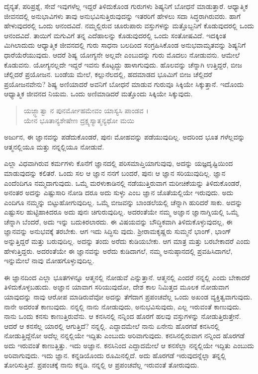 ದೈನ್ಯತೆ, ಪರಿಪ್ರಶ್ನೆ, ಸೇವೆ ಇವುಗಳೆಲ್ಲ ಇದ್ದರೆ ತಿಳಿದುಕೊಂಡ ಗುರುಗಳು ಶಿಷ್ಯನಿಗೆ ಬೋಧನೆ ಮಾಡುತ್ತಾರೆ. ಆಧ್ಯಾತ್ಮಿಕ ಜೀವನದಲ್ಲಿ ಅನುಭಾವಿಗಳು ತಾವು ಅನುಭವಿಸುತ್ತಿರುವುದನ್ನು ಇತರರಿಗೆ ಹೇಳಲು ಸದಾ ಸಿದ್ಧರಾಗಿರುವರು. ಹಾಗೆ ಹೇಳುವುದರಲ್ಲಿ ಒಂದು ಆನಂದವಿದೆ. ನಮ್ಮಲ್ಲಿರುವ ಚೂರುಪಾರು ವಸ್ತುಗಳನ್ನು ಮತ್ತೊಬ್ಬನಿಗೆ ಕೊಡುವುದರಲ್ಲಿ ಒಂದು ಆನಂದವಿದೆ. ತಾಯಿಗೆ ಮಗುವಿಗೆ ತನ್ನ ಎದೆಹಾಲನ್ನು ಕೊಡುವುದರಲ್ಲಿ ಒಂದು ಸಂತೋಷವಿದೆ. ಇದಕ್ಕಿಂತ ಮಿಗಿಲಾದುದು ಆಧ್ಯಾತ್ಮಿಕ ಜೀವನದಲ್ಲಿ ಗುರು ಸಾಧನಾ ಬಲದಿಂದ ಸಂಗ್ರಹಿಸಿಕೊಂಡ ಅನುಭವಾಮೃತವನ್ನು ಶಿಷ್ಯನಿಗೆ ಧಾರೆಯೆರೆಯುವುದು. ಆದರೆ ಶಿಷ್ಯ ಯೋಗ್ಯನೇ ಅಲ್ಲವೇ ಎಂಬುದನ್ನು ಗುರು ಮೊದಲು ನೋಡುವನು. ಆಮೇಲೆ ಕೊಡುವನು. ಯೋಗ್ಯನಲ್ಲದೇ ಇದ್ದರೆ ಇವನು ಕೊಟ್ಟದ್ದು ಹಾಳಾಗುವುದು. ಹೊಲವನ್ನು ಚೆನ್ನಾಗಿ ಉತ್ತಿದ್ದರೆ, ಬೀಜ ಚೆಲ್ಲಿದರೆ ಪ್ರಯೋಜನ. ಬಂಡೆಯ ಮೇಲೆ, ಕಲ್ಲುನೆಲದಲ್ಲಿ, ಹದಮಾಡದ ಭೂಮಿಗೆ ಬೀಜ ಚೆಲ್ಲಿದರೆ ಪ್ರಯೋಜನವೇನು? ಶಿಷ್ಯ ಅಣಿಯಾದರೆ ಅವನಿಗೆ ಬೋಧನೆ ಮಾಡುವ ಗುರುವೂ ಸಿಕ್ಕಿಯೇ ಸಿಕ್ಕುತ್ತಾನೆ. ಇದೊಂದು ಆಧ್ಯಾತ್ಮಿಕ ಜೀವನದ ನಿಯಮ. ಒಂದು ಅಣಿಮಾಡಿದರೆ ಮತ್ತೊಂದು ಸಿಕ್ಕಿಯೇ ಸಿಕ್ಕುವುದು.

\begin{verse}
ಯಜ್ಜ್ಞಾತ್ವಾ ನ ಪುನರ್ಮೋಹಮೇವಂ ಯಾಸ್ಯಸಿ ಪಾಂಡವ ।\\ಯೇನ ಭೂತಾನ್ಯಶೇಷೇಣ ದ್ರಕ್ಷ್ಯಸ್ಯಾತ್ಮನ್ಯಥೋ ಮಯಿ 
\end{verse}

{\small ಅರ್ಜುನ, ಈ ಜ್ಞಾನವನ್ನು ಪಡೆದುಕೊಂಡರೆ, ಪುನಃ ಮೋಹವನ್ನು ಪಡೆಯುವುದಿಲ್ಲ. ಅದರಿಂದ ಭೂತ ಗಳೆಲ್ಲವನ್ನು ಆತ್ಮನಲ್ಲಿಯೂ ಮತ್ತು ನನ್ನಲ್ಲಿಯೂ ನೋಡುವೆ.}

ಎಲ್ಲಾ ವಿಧವಾಗಿರುವ ಕರ್ಮಗಳು ಕೊನೆಗೆ ಜ್ಞಾನದಲ್ಲಿ ಪರಿಸಮಾಪ್ತಿಯಾಗುವುವು, ಅದನ್ನು ಯಜ್ಞದೃಷ್ಟಿಯಿಂದ ಮಾಡುವುದನ್ನು ಕಲಿತರೆ. ಒಂದು ಸಲ ಆ ಜ್ಞಾನ ನನಗೆ ಬಂದರೆ, ಪುನಃ ಆ ಜ್ಞಾನ ಸರಿಯುವುದಿಲ್ಲ. ಜ್ಞಾನ ಎಂದೆಂದಿಗೂ ನಮ್ಮದಾಗುವುದು. ಒಮ್ಮೆ ಮರಳುಕಾಡಿನಲ್ಲಿ ನಡೆಯುತ್ತಿರುವಾಗ ಮರೀಚಿಕೆಯನ್ನು ತಿಳಿದುಕೊಂಡರೆ, ಅನಂತರ ಅದನ್ನು ಎಷ್ಟುಸಾರಿ ನೋಡಿ ದರೂ ಅದು ಸುಳ್ಳು ಎಂಬ ಜ್ಞಾನ ಜೊತೆಯಲ್ಲಿಯೇ ಇರುವುದು. ಅದು ಎಂದಿಗೂ ನಮ್ಮನ್ನು ಬಿಟ್ಟುಹೋಗುವುದಿಲ್ಲ. ಒಮ್ಮೆ ಬೀಜವನ್ನು ಬಾಂಡಲೆಯಲ್ಲಿ ಚೆನ್ನಾಗಿ ಹುರಿದರೆ ಸಾಕು. ಅದನ್ನು ಎಷ್ಟುಸಲ ಹುಟ್ಟಿಹಾಕಿದರೂ ಅದು ಪುನಃ ಚಿಗುರುವುದಿಲ್ಲ. ಅದರಂತೆಯೇ ನಮ್ಮ ಅಜ್ಞಾನ ಜ್ಞಾನಾಗ್ನಿಯಲ್ಲಿ ಒಮ್ಮೆ ಚೆನ್ನಾಗಿ ಬೆಂದರೆ, ಅದು ಇನ್ನು ಬದುಕಿರಲಾರದು. ಈ ವಿಷಯವನ್ನು ಬೌದ್ಧಿಕವಾಗಿ ತಿಳಿದುಕೊಳ್ಳುವುದಲ್ಲ, ಈ ಜ್ಞಾನವನ್ನು ಅನುಭವಕ್ಕೆ ತರಬೇಕು. ಆಗ ಇದು ಸಿದ್ಧಿಸು ವುದು. ಶ್ರೀರಾಮಕೃಷ್ಣರು ಸುಮ್ಮನೆ ಭಾಂಗ್, ಭಾಂಗ್ ಅನ್ನುತ್ತಿದ್ದರೆ ಮತ್ತು ಬರುವುದಿಲ್ಲ. ಅದನ್ನು ತಂದು ಅರೆದು ಕುಡಿಯಬೇಕು. ಆಗ ಮಾತ್ರ ಮತ್ತು ಬರಬೇಕಾದರೆ ಎಂದು ಹೇಳುತ್ತಿದ್ದರು. ಅದರಂತೆಯೇ ಈ ಜ್ಞಾನವನ್ನು ಅರೆದು ಕುಡಿದಾಗಲೆ, ನಮ್ಮ ಅನುಷ್ಠಾನದಲ್ಲಿ ಪ್ರವಹಿಸಿದಾಗಲೆ, ಇನ್ನುಮೇಲೆ ನಾವು ಮೋಹಗೊಳ್ಳುವುದಿಲ್ಲ.

ಈ ಜ್ಞಾನದಿಂದ ಎಲ್ಲಾ ಭೂತಗಳನ್ನೂ ಆತ್ಮನಲ್ಲಿ ನೋಡುವೆ ಎನ್ನುತ್ತಾನೆ. ಆತ್ಮನಲ್ಲಿ ಎಂದರೆ ನನ್ನಲ್ಲಿ ಎಂದು ಬೇಕಾದರೆ ತಿಳಿದುಕೊಳ್ಳಬಹುದು. ಅಜ್ಞಾನ ಯಾವಾಗ ಸರಿಯುವುದೋ, ದೇಶ ಕಾಲ ನಿಮಿತ್ತದ ಮೂಲಕ ನೋಡುವಾಗ ಯಾವುದನ್ನು ನಾವು ಆರೋಪ ಮಾಡಿರುವೆವೋ ಅದನ್ನು ತೆಗೆದಾಗ ಪ್ರಪಂಚವೆಲ್ಲ ಒಂದು ಅಖಂಡ ವ್ಯಕ್ತಿತ್ವವಾಗುವುದು. ನಾನೇ ಅದರಂತೆ ಕಾಣುವುದು. ನನ್ನಲ್ಲಿ ನಾನು ನೋಡುವುದು, ಅನುಭವಿಸುವುದು, ಎಲ್ಲ ಇರುವಂತೆ ಕಾಣುವುದು. ನಾನು ಒಂದು ಕನಸು ಕಾಣುತ್ತಿರುವೆನು. ಆ ಕನಸಿನಲ್ಲಿ ನನ್ನಿಂದ ಹೊರಗೆ ಹಲವು ವಸ್ತುಗಳನ್ನು ನೋಡುತ್ತಿರುತ್ತೇನೆ. ಆದರೆ ಆ ಕನಸೆಲ್ಲ ಯಾರಲ್ಲಿ ಆಗುತ್ತಿದೆ? ನನ್ನಲ್ಲಿ. ಎದ್ದಾದಮೇಲೆ ನಾನು ಏನೇನು ಹೊರಗಡೆ ಕನಸಿನಲ್ಲಿ ನೋಡುತ್ತಿದ್ದೆನೋ ಅದೆಲ್ಲ ನನ್ನಲ್ಲಿಯೇ ಇದ್ದಿತು ಎಂಬುದು ಅರಿವಾಗುವುದು. ಕನಸಿನಲ್ಲಿರುವಾಗ ನನ್ನಿಂದ ಹೊರಗಡೆ ಅದು ಇರುವಂತೆ ಕಾಣುತ್ತಿತ್ತು. ಇದು ಅಜ್ಞಾನ. ಕನಸಿನಿಂದ ಎದ್ದಾದಮೇಲೆ ಆ ಕನಸೆಲ್ಲಾ ನನ್ನಲ್ಲಿಯೇ ಇದ್ದಿತು ಎಂಬುದು ಅರಿವಾಗುವುದು. ಇದು ಜ್ಞಾನ. ಕನ್ನಡಿಯೊಂದು ರೂಮಿನಲ್ಲಿದೆ. ಅದು ಹೊರಗಡೆ ಇರುವುದನ್ನೆಲ್ಲಾ ತನ್ನಲ್ಲಿ ತೋರಿಸುತ್ತಿದೆ. ಪ್ರಪಂಚಕ್ಕೆ ನಾನು ಕನ್ನಡಿ. ನನ್ನಲ್ಲಿ ಆ ಪ್ರಪಂಚವೆಲ್ಲ ಇರುವಂತೆ ತೋರುವುದು.

